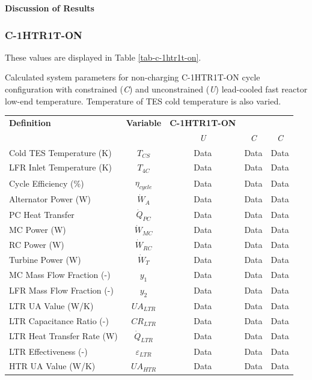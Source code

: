 \begin{paracol}{2}
\textbf{Discussion of Results}


\subsubsection{C-1HTR1T-ON}

These values are displayed in Table \ref{tab-c-1htr1t-on}.

\begin{specialtable}[H] 
    \caption{Calculated system parameters for non-charging C-1HTR1T-ON cycle configuration with constrained (\textit{C}) and unconstrained (\textit{U}) lead-cooled fast reactor low-end temperature. Temperature of TES cold temperature is also varied.\label{tab-c-1htr1t-on}}
    \begin{tabular}{lcccc}
    \toprule
    \textbf{Definition} & \textbf{Variable} & \textbf{C-1HTR1T-ON}\\
    & & \textit{U} & \textit{C} & \textit{C}\\
    \midrule
    Cold TES Temperature (K)	&	$T_{CS}$	&	Data	&	Data	&	Data	\\
    LFR Inlet Temperature (K)	&	$T_{4C}$	&	Data	&	Data	&	Data	\\
    Cycle Efficiency (\%)	&	$\eta_{cycle}$	&	Data	&	Data	&	Data	\\
    Alternator Power (W)	&	$\dot{W}_{A}$	&	Data	&	Data	&	Data	\\
    PC Heat Transfer	&	$\dot{Q}_{PC}$	&	Data	&	Data	&	Data	\\
    MC Power (W)	&	$\dot{W}_{MC}$	&	Data	&	Data	&	Data	\\
    RC Power (W)	&	$\dot{W}_{RC}$	&	Data	&	Data	&	Data	\\
    Turbine Power (W)	&	$\dot{W}_{T}$	&	Data	&	Data	&	Data	\\
    MC Mass Flow Fraction (-)	&	$y_{1}$	&	Data	&	Data	&	Data	\\
    LFR Mass Flow Fraction (-)	&	$y_{2}$	&	Data	&	Data	&	Data	\\
    LTR UA Value (W/K)	&	$UA_{LTR}$	&	Data	&	Data	&	Data	\\
    LTR Capacitance Ratio (-)	&	$CR_{LTR}$	&	Data	&	Data	&	Data	\\
    LTR Heat Transfer Rate (W)	&	$\dot{Q}_{LTR}$	&	Data	&	Data	&	Data	\\
    LTR Effectiveness (-)	&	$\varepsilon_{LTR}$	&	Data	&	Data	&	Data	\\
    HTR UA Value (W/K)	&	$UA_{HTR}$	&	Data	&	Data	&	Data	\\

\end{tabular}
\end{specialtable}
\end{paracol}
